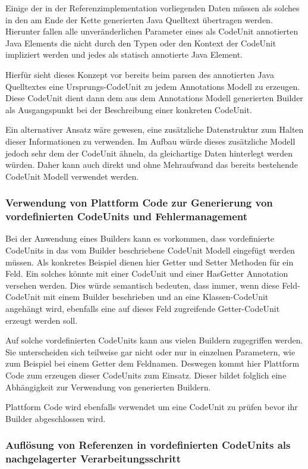 \documentclass[12pt,oneside,a4paper,parskip]{scrbook}
\begin{document}
Einige der in der Referenzimplementation vorliegenden Daten müssen als solches in den am Ende der Kette generierten Java Quelltext übertragen werden. Hierunter fallen alle unveränderlichen Parameter eines als CodeUnit annotierten Java Elements die nicht durch den Typen oder den Kontext der CodeUnit impliziert werden und jedes als statisch annotierte Java Element.

Hierfür sieht dieses Konzept vor bereits beim parsen des annotierten Java Quelltextes eine Ursprungs-CodeUnit zu jedem Annotations Modell zu erzeugen. Diese CodeUnit dient dann dem aus dem Annotations Modell generierten Builder als Ausgangspunkt bei der Beschreibung einer konkreten CodeUnit.

Ein alternativer Ansatz wäre gewesen, eine zusätzliche Datenstruktur zum Halten dieser Informationen zu verwenden. Im Aufbau würde dieses zusätzliche Modell jedoch sehr dem der CodeUnit ähneln, da gleichartige Daten hinterlegt werden würden. Daher kann auch direkt und ohne Mehraufwand das bereits bestehende CodeUnit Modell verwendet werden.

\subsubsection{Verwendung von Plattform Code zur Generierung von vordefinierten CodeUnits und Fehlermanagement}

Bei der Anwendung eines Builders kann es vorkommen, dass vordefinierte CodeUnits in das vom Builder beschriebene CodeUnit Modell eingefügt werden müssen. Als konkretes Beispiel dienen hier Getter und Setter Methoden für ein Feld. Ein solches könnte mit einer CodeUnit und einer HasGetter Annotation versehen werden. Dies würde semantisch bedeuten, dass immer, wenn diese Feld-CodeUnit mit einem Builder beschrieben und an eine Klassen-CodeUnit angehängt wird, ebenfalls eine auf dieses Feld zugreifende Getter-CodeUnit erzeugt werden soll.

Auf solche vordefinierten CodeUnits kann aus vielen Buildern zugegriffen werden. Sie unterscheiden sich teilweise gar nicht oder nur in einzelnen Parametern, wie zum Beispiel bei einem Getter dem Feldnamen. Deswegen kommt hier Plattform Code zum erzeugen dieser CodeUnits zum Einsatz. Dieser bildet folglich eine Abhängigkeit zur Verwendung von generierten Buildern.

Plattform Code wird ebenfalls verwendet um eine CodeUnit zu prüfen bevor ihr Builder abgeschlossen wird.

\subsubsection{Auflösung von Referenzen in vordefinierten CodeUnits als nachgelagerter Verarbeitungsschritt}
\end{document}
